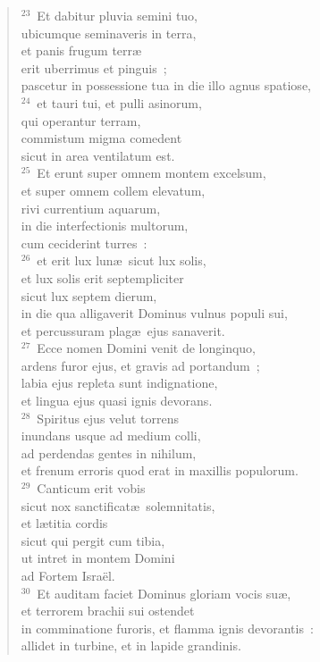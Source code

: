 \begin{verse}
${}^{23}$~Et dabitur pluvia semini tuo,\\ ubicumque seminaveris in terra,\\ et panis frugum terr\ae \\ erit uberrimus et pinguis~;\\ pascetur in possessione tua in die illo agnus spatiose,\\
${}^{24}$~et tauri tui, et pulli asinorum,\\ qui operantur terram,\\ commistum migma comedent\\ sicut in area ventilatum est.\\
${}^{25}$~Et erunt super omnem montem excelsum,\\ et super omnem collem elevatum,\\ rivi currentium aquarum,\\ in die interfectionis multorum,\\ cum ceciderint turres~:\\
${}^{26}$~et erit lux lun\ae\ sicut lux solis,\\ et lux solis erit septempliciter\\ sicut lux septem dierum,\\ in die qua alligaverit Dominus vulnus populi sui,\\ et percussuram plag\ae\ ejus sanaverit.\\
${}^{27}$~Ecce nomen Domini venit de longinquo,\\ ardens furor ejus, et gravis ad portandum~;\\ labia ejus repleta sunt indignatione,\\ et lingua ejus quasi ignis devorans.\\
${}^{28}$~Spiritus ejus velut torrens\\ inundans usque ad medium colli,\\ ad perdendas gentes in nihilum,\\ et frenum erroris quod erat in maxillis populorum.\\
${}^{29}$~Canticum erit vobis\\ sicut nox sanctificat\ae\ solemnitatis,\\ et l\ae titia cordis\\ sicut qui pergit cum tibia,\\ ut intret in montem Domini\\ ad Fortem Isra\"el.\\
${}^{30}$~Et auditam faciet Dominus gloriam vocis su\ae ,\\ et terrorem brachii sui ostendet\\ in comminatione furoris, et flamma ignis devorantis~:\\ allidet in turbine, et in lapide grandinis.\\

\end{verse}

